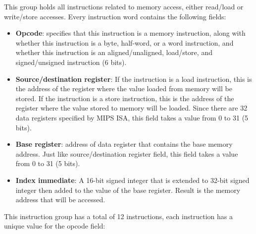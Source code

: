 \documentclass[oneside]{book}
\begin{document}
This group holds all instructions related to memory access, either
read/load or write/store accesses. Every instruction word contains
the following fields:

\begin{itemize}

\item \textbf{Opcode}: specifies that this instruction is a memory
                       instruction, along with whether this instruction
                       is a byte, half-word, or a word instruction, and
                       whether this instruction is an aligned/unaligned,
                       load/store, and signed/unsigned instruction
                       (6 bits).

\item \textbf{Source/destination register}: If the instruction is a load
                                            instruction, this is the address
                                            of the register where the value
                                            loaded from memory will be stored.
                                            If the instruction is a store
                                            instruction, this is the address
                                            of the register where the value
                                            stored to memory will be loaded.
                                            Since there are 32 data registers
                                            specified by MIPS ISA, this field
                                            takes a value from 0 to 31
                                            (5 bits).

\item \textbf{Base register}: address of data register that contains
                              the base memory address. Just like
                              source/destination register field, this
                              field takes a value from 0 to 31 (5 bits).

\item \textbf{Index immediate}: A 16-bit signed integer that is extended to
                                32-bit signed integer then added to the value
                                of the base register. Result is the memory
                                address that will be accessed.

\end{itemize}

This instruction group has a total of 12 instructions, each instruction
has a unique value for the opcode field:
\end{document}
